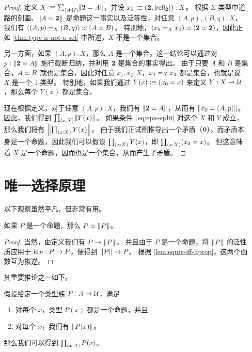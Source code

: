 \begin{proof}
  定义 $X\defeq \sm{A:\type} \brck{\bool = A}$，并设 $x_0 \defeq (\bool, \bproj{\refl{\bool}}) : X$。
  根据 $\Sigma$ 类型中道路的刻画、$\brck{A=\bool}$ 是命题这一事实以及泛等性，对任意 $(A,p),(B,q):X$，我们有 $\eqv{(\id[X]{(A,p)}{(B,q)})}{(\eqv AB)}$。
  特别地，$\eqv{(\id[X]{x_0}{x_0})}{(\eqv \bool\bool)}$，因此正如 \cref{thm:type-is-not-a-set} 中所述，$X$ 不是一个集合。

  另一方面，如果 $(A,p):X$，那么 $A$ 是一个集合。这一结论可以通过对 $p:\brck{\bool=A}$ 施行截断归纳，并利用 $\bool$ 是集合的事实得出。
  由于只要 $A$ 和 $B$ 是集合，$\eqv A B$ 就也是集合，因此对任意 $x_1,x_2:X$，$\id[X]{x_1}{x_2}$ 都是集合，也就是说 $X$ 是一个 1-类型。
  特别地，如果我们通过 $Y(x) \defeq (x_0=x)$ 来定义 $Y:X\to\UU$，那么每个 $Y(x)$ 都是集合。

  现在根据定义，对于任意 $(A,p):X$，我们有 $\brck{\bool=A}$，从而有 $\brck{x_0 = (A,p)}$。
  因此，我们得到 $\prd{x:X} \brck{Y(x)}$。
  如果条件~\eqref{eq:epis-split} 对这个 $X$ 和 $Y$ 成立，那么我们将有 $\brck{\prd{x:X} Y(x)}$。
  由于我们正试图推导出一个矛盾（$\emptyt$），而矛盾本身是一个命题，因此我们可以假设 $\prd{x:X} Y(x)$，即 $\prd{x:X} (x_0=x)$。
  但这意味着 $X$ 是一个命题，因而也是一个集合，从而产生了矛盾。
\end{proof}

%
%

\section{唯一选择原理}
\label{sec:unique-choice}

%
%

以下观察虽然平凡，但非常有用。

\begin{lem}\label{thm:prop-equiv-trunc}
  如果 $P$ 是一个命题，那么 $\eqv P {\brck P}$。
\end{lem}

\begin{proof}
  当然，由定义我们有 $P\to \brck{P}$。
  并且由于 $P$ 是一个命题，将 $\brck P$ 的泛性质应用于 $\idfunc[P] :P\to P$，便得到 $\brck P \to P$。
  根据 \cref{lem:equiv-iff-hprop}，这两个函数互为拟逆。
\end{proof}

其重要推论之一如下。

\begin{cor}[唯一选择原理]\label{cor:UC}
  假设给定一个类型族 $P:A\to \type$，满足
  \begin{enumerate}
  \item 对每个 $x$，类型 $P(x)$ 都是一个命题，并且
  \item 对每个 $x$，我们有 $\brck {P(x)}$。
  \end{enumerate}
  那么我们可以得到 $\prd{x:A} P(x)$。
\end{cor}

